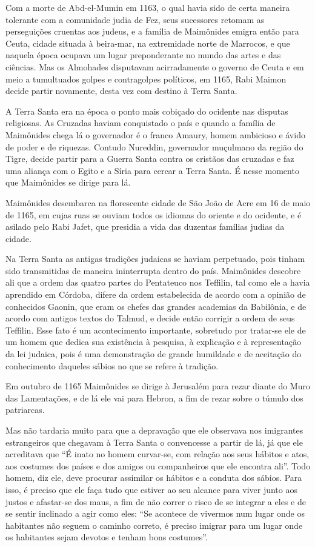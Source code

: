 Com a morte de Abd-el-Mumin em 1163, o qual havia sido de certa maneira
tolerante com a comunidade judia de Fez, seus sucessores retomam as
perseguições cruentas aos judeus, e a família de Maimônides emigra então
para Ceuta, cidade situada à beira-mar, na extremidade norte de
Marrocos, e que naquela época ocupava um lugar preponderante no mundo
das artes e das ciências. Mas os Almohades disputavam acirradamente o
governo de Ceuta e em meio a tumultuados golpes e contragolpes
políticos, em 1165, Rabi Maimon decide partir novamente, desta vez com
destino à Terra Santa.

A Terra Santa era na época o ponto mais cobiçado do ocidente nas
disputas religiosas. As Cruzadas haviam conquistado o país e quando a
família de Maimônides chega lá o governador é o franco Amaury, homem
ambicioso e ávido de poder e de riquezas. Contudo Nureddin, governador
muçulmano da região do Tigre, decide partir para a Guerra Santa contra
os cristãos das cruzadas e faz uma aliança com o Egito e a Síria para
cercar a Terra Santa. É nesse momento que Maimônides se dirige para lá.

Maimônides desembarca na florescente cidade de São João de Acre em 16 de
maio de 1165, em cujas ruas se ouviam todos os idiomas do oriente e do
ocidente, e é asilado pelo Rabi Jafet, que presidia a vida das duzentas
famílias judias da cidade.

Na Terra Santa as antigas tradições judaicas se haviam perpetuado, pois
tinham sido transmitidas de maneira ininterrupta dentro do país. Maimônides descobre ali que a ordem das quatro partes do Pentateuco nos
Teffilin, tal como ele a havia aprendido em Córdoba, difere da ordem
estabelecida de acordo com a opinião de conhecidos Gaonin, que eram os
chefes das grandes academias da Babilônia, e de acordo com antigos
textos do Talmud, e decide então corrigir a ordem de seus Teffilin. Esse
fato é um acontecimento importante, sobretudo por tratar-se ele de um
homem que dedica sua existência à pesquisa, à explicação e à
representação da lei judaica, pois é uma demonstração de grande
humildade e de aceitação do conhecimento daqueles sábios no que se
refere à tradição.

Em outubro de 1165 Maimônides se dirige à Jerusalém para rezar diante
do Muro das Lamentações, e de lá ele vai para Hebron, a fim de rezar
sobre o túmulo dos patriarcas.

Mas não tardaria muito para que a depravação que ele observava nos
imigrantes estrangeiros que chegavam à Terra Santa o convencesse a
partir de lá, já que ele acreditava que ``É inato no homem curvar-se,
com relação aos seus hábitos e atos, aos costumes dos países e dos
amigos ou companheiros que ele encontra ali''. Todo homem, diz ele, deve
procurar assimilar os hábitos e a conduta dos sábios. Para isso, é
preciso que ele faça tudo que estiver ao seu alcance para viver junto
aos justos e afastar-se dos maus, a fim de não correr o risco de se
integrar a eles e de se sentir inclinado a agir como eles: ``Se acontece
de vivermos num lugar onde os habitantes não seguem o caminho correto, é
preciso imigrar para um lugar onde os habitantes sejam devotos e tenham
bons costumes''.

